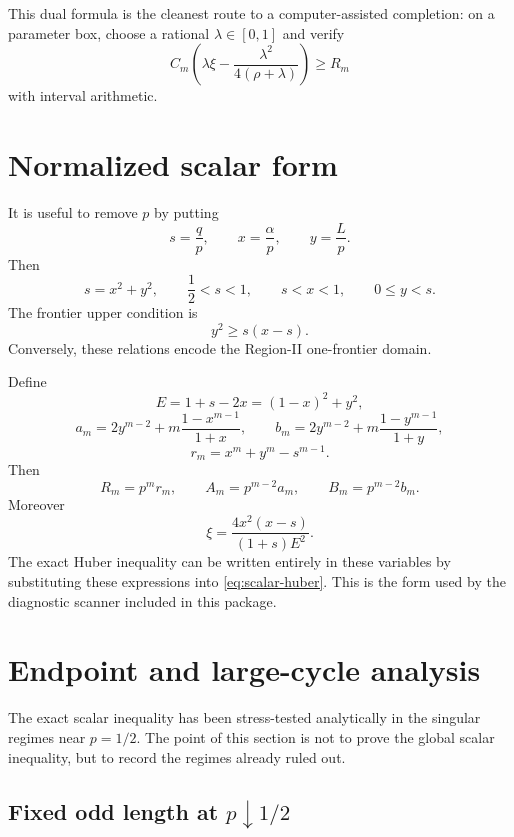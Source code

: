 \documentclass[11pt]{article}
\begin{document}
This dual formula is the cleanest route to a computer-assisted completion:
on a parameter box, choose a rational $\lambda\in[0,1]$ and verify
\[
        C_m\left(\lambda\xi-\frac{\lambda^2}{4(\rho+\lambda)}\right)
        \ge R_m
\]
with interval arithmetic.

\section{Normalized scalar form}

It is useful to remove $p$ by putting
\begin{equation}\label{eq:normalized-vars}
        s=\frac qp,
        \qquad x=\frac\alpha p,
        \qquad y=\frac Lp.
\end{equation}
Then
\begin{equation}\label{eq:sxy-domain}
        s=x^2+y^2,
        \qquad
        \frac12<s<1,
        \qquad
        s<x<1,
        \qquad
        0\le y<s.
\end{equation}
The frontier upper condition is
\begin{equation}\label{eq:frontier-normalized}
        y^2\ge s(x-s).
\end{equation}
Conversely, these relations encode the Region-II one-frontier domain.

Define
\[
        E=1+s-2x=(1-x)^2+y^2,
\]
\[
        a_m=2y^{m-2}+m\frac{1-x^{m-1}}{1+x},
        \qquad
        b_m=2y^{m-2}+m\frac{1-y^{m-1}}{1+y},
\]
\[
        r_m=x^m+y^m-s^{m-1}.
\]
Then
\[
        R_m=p^m r_m,
        \qquad
        A_m=p^{m-2}a_m,
        \qquad
        B_m=p^{m-2}b_m.
\]
Moreover
\[
        \xi=\frac{4x^2(x-s)}{(1+s)E^2}.
\]
The exact Huber inequality can be written entirely in these variables by
substituting these expressions into \eqref{eq:scalar-huber}.  This is the
form used by the diagnostic scanner included in this package.

\section{Endpoint and large-cycle analysis}

The exact scalar inequality has been stress-tested analytically in the
singular regimes near $p=1/2$.  The point of this section is not to prove
the global scalar inequality, but to record the regimes already ruled out.

\subsection{Fixed odd length at $p\downarrow1/2$}
\end{document}
